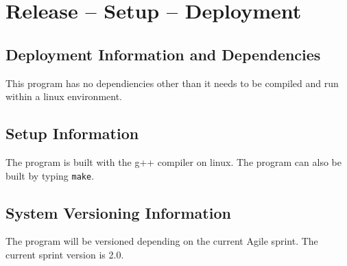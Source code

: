 
\chapter{Release -- Setup -- Deployment}


\section{Deployment Information and Dependencies}
This program has no dependiencies other than it needs to be compiled and run within a linux environment. 



\section{Setup Information}
The program is built with the g++ compiler on linux. The program can also be built by typing {\tt make}.



\section{System  Versioning Information}
The program will be versioned depending on the current Agile sprint. The current sprint version is 2.0.
